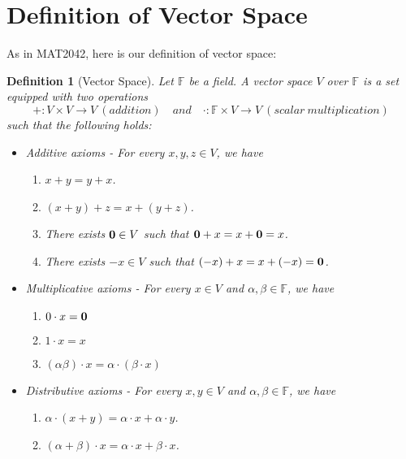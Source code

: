 \documentclass[12pt]{amsbook}
\newtheorem{definition}[theorem]{Definition}
\begin{document}
\section{Definition of Vector Space}
As in MAT2042, here is our definition of vector space:
\begin{definition}[Vector Space]
Let $\mathbb{F}$ be a field. A vector space $V$ over $\mathbb{F}$ is a set equipped with two operations
$$+: V \times V \to V\ (addition) \quad and \quad  \cdot: \mathbb{F} \times V \to V\ (scalar\ multiplication)$$
such that the following holds:
\begin{itemize}
    \item Additive axioms - For every $x,y,z \in V$, we have
        \begin{enumerate}
            \item $x+y = y+x$.
            \item $(x+y)+z = x+(y+z)$.
            \item There exists ${\bf 0} \in V$ such that ${\bf 0}+x = x+{\bf 0} = x$.
            \item There exists $-x \in V$ such that $(-x) + x = x + (-x) = {\bf 0}$.
        \end{enumerate}
    \item Multiplicative axioms - For every $x \in V$ and $\alpha, \beta \in \mathbb{F}$, we have
        \begin{enumerate}
            \item $0 \cdot x = {\bf 0}$
            \item $1\cdot x = x$
            \item $(\alpha\beta)\cdot x = \alpha \cdot (\beta \cdot x)$
        \end{enumerate}
        \item Distributive axioms - For every $x,y \in V$ and $\alpha, \beta \in \mathbb{F}$, we have
        \begin{enumerate}
            \item $\alpha\cdot (x+y) = \alpha\cdot x + \alpha\cdot y$.
            \item $(\alpha+\beta)\cdot x = \alpha\cdot x + \beta\cdot x$.    
        \end{enumerate}
\end{itemize}  

\end{definition}
\end{document}

